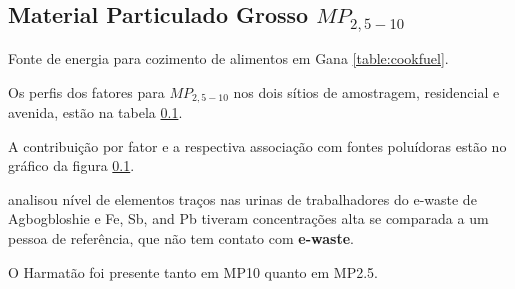 \subsection{Material Particulado Grosso $MP_{2,5-10}$}

Fonte de energia para cozimento de alimentos em Gana \ref{table:cookfuel}.
\begin{table}[H]
 \centering
  
  \caption{Fontes de energia usadas para cozimento de alimentos em 
           Gana \citep{ghanacensus2013} \label{table:cookfuel}}
\end{table}

Os perfis dos fatores para $MP_{2,5-10}$ nos dois sítios de amostragem, 
residencial e avenida, estão na tabela \ref{}.

A contribuição por fator e a respectiva associação com fontes poluídoras
estão no gráfico da figura \ref{}. 

\citep{asante2012} analisou nível de elementos traços nas urinas de trabalhadores 
do e-waste de Agbogbloshie e Fe, Sb, and Pb tiveram concentrações alta se comparada
a um pessoa de referência, que não tem contato com \textbf{e-waste}.

O Harmatão foi presente tanto em MP10 quanto em MP2.5.

\begin{table}[H]
  
  \caption{Análise de Fatores para $MP_{2,5-10}$ na área residencial
           excluindo-se dias de ocorrência do Harmatão.
           Rotação varimax - 5 fatores retidos (n=).
           (\textcolor{red}{h} : Comunalidade; 
           \textcolor{red}{S=1-h} : Singularidade; 
           \textcolor{red}{C} : Complexidade.)
           \label{table:beautifulFAdisplay_RGsH4}}
\end{table}

\begin{table}[H]
  
  \caption{Análise de Fatores para $MP_{2,5-10}$ na avenida
           excluindo-se dias de ocorrência do Harmatão.
           Rotação varimax - 5 fatores retidos (n=).
           (\textcolor{red}{h} : Comunalidade; 
           \textcolor{red}{S=1-h} : Singularidade; 
           \textcolor{red}{C} : Complexidade.)
           \label{table:beautifulFAdisplay_TGsH4}}
\end{table}

\begin{table}[H]
  \centering
    
    \caption{residencial $MP_{2,5-10}$ removendo-se os dias do Harmatão 
              seed=123; n=. 
             \label{table:RGsH_profiles4}}
\end{table}

